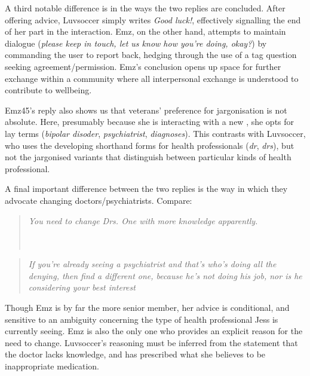 A third notable difference is in the ways the two replies are concluded. After offering advice, Luvsoccer simply writes \emph{Good luck!}, effectively signalling the end of her part in the interaction. Emz, on the other hand, attempts to maintain dialogue (\emph{please keep in touch, let us know how you're 
doing, okay?}) by commanding the user to report back, hedging through the use of a tag question seeking agreement\slash permission. Emz's conclusion opens up space for further exchange within a community where all interpersonal exchange is understood to contribute to wellbeing.

Emz45's reply also shows us that veterans' preference for jargonisation is not absolute. Here, presumably because she is interacting with a new , she opts for lay terms (\emph{bipolar disoder}, \emph{psychiatrist}, \emph{diagnoses}). This contrasts with Luvsoccer, who uses the developing shorthand forms for health professionals (\emph{dr}, \emph{drs}), but not the jargonised variants that distinguish between particular kinds of health professional.

A final important difference between the two replies is the way in which they advocate changing doctors\slash psychiatrists. Compare:

\begin{multicols}{2}
\begin{quote}

\emph{You need to change Drs. One with more knowledge apparently.} ~\\~\\~\\
\end{quote}

\begin{quote}

\emph{If you're already seeing a psychiatrist and that's who's doing all the denying, then find a different one, because he's not doing his job, nor is he considering your best interest}
\end{quote}
\end{multicols}
%
\noindent Though Emz is by far the more senior member, her advice is conditional, and sensitive to an ambiguity concerning the type of health professional Jess is currently seeing. Emz is also the only one who provides an explicit reason for the need to change. Luvsoccer's reasoning must be inferred from the statement that the doctor lacks knowledge, and has prescribed what she believes to be inappropriate medication. 

